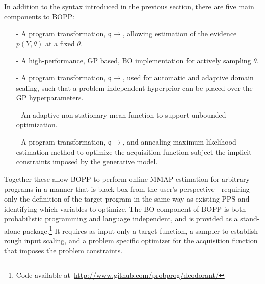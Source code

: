 
In addition to the syntax introduced in the previous section, there are five main components to BOPP:
\begin{itemize}
	\item[-] A program transformation, \texttt{q}$\rightarrow$\qmarg, allowing estimation of the evidence $p(Y,\theta)$ at a fixed $\theta$.
	\item[-] A high-performance, GP based, BO implementation for actively sampling $\theta$.
	\item[-] A program transformation, \texttt{q}$\rightarrow$\qprior,  used for automatic and adaptive domain scaling, such that a problem-independent hyperprior can be placed over the GP hyperparameters.
	\item[-] An adaptive non-stationary mean function to support unbounded optimization.
	\item[-] A program transformation, \texttt{q}$\rightarrow$\qacq, and annealing maximum likelihood estimation method to optimize the acquisition function subject the implicit constraints imposed by the generative model.
\end{itemize}
Together these allow BOPP to perform online MMAP estimation for arbitrary programs in a manner that is black-box from the user's perspective - requiring only the definition of the target program in the same way as existing PPS and identifying which variables to optimize.  The BO component of BOPP is both probabilistic programming and language independent, and is provided as a stand-alone package.\footnote{Code available at~\href{http://www.github.com/probprog/deodorant/}{\url{http://www.github.com/probprog/deodorant/}}}  It requires as input only a target function, a sampler to establish rough input scaling, and a problem specific optimizer for the acquisition function that imposes the problem constraints.  %


